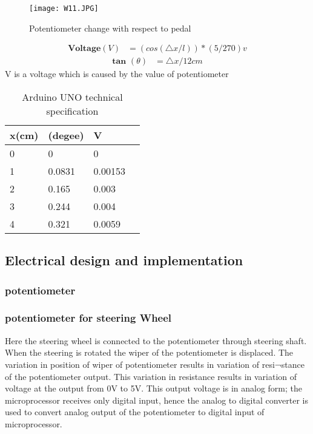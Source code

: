 \documentclass[12pt,a4paper]{article}
\begin{document}
\begin{center}
\begin{center}
\begin{center}
\begin{figure}[H]
	\centering 
	\texttt{[image: W11.JPG]}
	\caption{Potentiometer change with respect to pedal}	
\end{figure}
\begin{align}
\textbf{Voltage}(V)&=(cos(\bigtriangleup x/l))*(5/270)v
\end{align}
\begin{align}
\textbf{tan }(\theta)& = \bigtriangleup x/12cm
\end{align}
V is a voltage which is caused by the value of potentiometer
\begin{table}[H]
	\caption{Arduino UNO technical specification}
	\vspace{0.3cm}
	\begin{tabular}{|l|l|l|l}
		\hline
		\bigtriangleup x(cm) & \bigtriangleup \theta (degee)} &  {V}\\
		\hline
		0 & 0 & 0\\ 
		\hline
	    1 & 0.0831 & 0.00153\\ 
		\hline
		2 & 0.165& 0.003\\ 
	    3& 0.244& 0.004\\ 
		\hline
		4 & 0.321& 0.0059\\ 
		\hline
		
	\end{tabular}
\end{table}	

\subsection{Electrical design and implementation}
\subsubsection{potentiometer}
\subsubsection*{potentiometer for steering Wheel}
Here the steering wheel is connected to the potentiometer through steering shaft. When the steering is rotated the wiper of the potentiometer is displaced. The variation in position of wiper of potentiometer results in variation of resi¬stance of the potentiometer output. This variation in resistance results in variation of voltage at the output from 0V to 5V. This output voltage is in analog form; the microprocessor receives only digital input, hence the analog to digital converter is used to convert analog output of the potentiometer to digital input of microprocessor.




\end{center}
\end{center}
\end{center}
\end{document}
